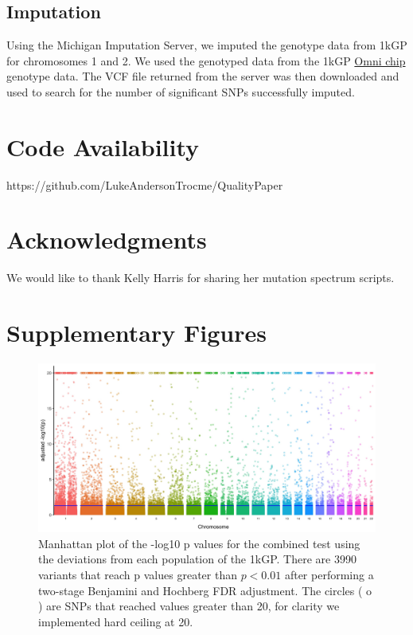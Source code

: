\documentclass[9pt,lineno]{elife}
\begin{document}
\subsection{Imputation}
Using the Michigan Imputation Server, we imputed the genotype data from 1kGP for chromosomes 1 and 2.
We used the genotyped data from the 1kGP \href{ftp://ftp.1000genomes.ebi.ac.uk/vol1/ftp/release/20130502/supporting/hd_genotype_chip/ALL.chip.omni_broad_sanger_combined.20140818.snps.genotypes.vcf.gz}{Omni chip} genotype data.
The VCF file returned from the server was then downloaded and used to search for the number of significant SNPs successfully imputed.

\section{Code Availability}
https://github.com/LukeAndersonTrocme/QualityPaper

\section{Acknowledgments}
We would like to thank Kelly Harris for sharing her mutation spectrum scripts.


%


\section{Supplementary Figures}
\renewcommand{\thefigure}{S\arabic{figure}}
\setcounter{figure}{0}   	

\begin{figure}
\includegraphics[width=\hsize,keepaspectratio]{./Figures/ManhattanPlot_adjusted.jpg}

\caption{Manhattan plot of the -log10 p values for the combined test using the deviations from each population of the 1kGP. 
There are 3990 variants that reach p values greater than $ p < 0.01$ after performing a two-stage Benjamini and Hochberg FDR adjustment. 
The circles ( o ) are SNPs that reached values greater than 20, for clarity we implemented hard ceiling at 20.}
  \label{Manhattan}
\end{figure}
\end{document}
